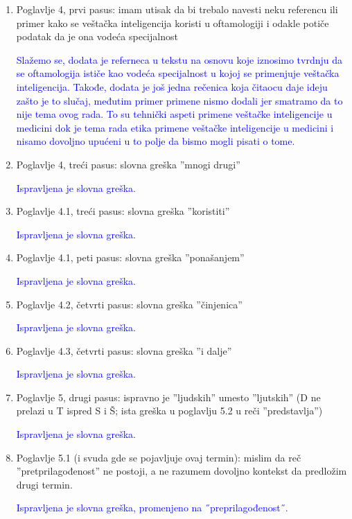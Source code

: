 \documentclass[a4paper]{report}
\newcommand{\odgovor}[1]{\textcolor{blue}{#1}}
\begin{document}
\begin{enumerate}
\item Poglavlje 4, prvi pasus: imam utisak da bi trebalo navesti neku referencu ili primer kako se veštačka inteligencija koristi u oftamologiji i odakle potiče podatak da je ona vodeća specijalnost 

\odgovor{Slažemo se, dodata je referneca u tekstu na osnovu koje iznosimo tvrdnju da se oftamologija ističe kao vodeća specijalnost u kojoj se primenjuje veštačka inteligencija. Takođe, dodata je još jedna rečenica koja čitaocu daje ideju zašto je to slučaj, međutim primer primene nismo dodali jer smatramo da to nije tema ovog rada. To su tehnički aspeti primene veštačke inteligencije u medicini dok je tema rada etika primene veštačke inteligencije u medicini i nisamo dovoljno upućeni u to polje da bismo mogli pisati o tome.} 

\item Poglavlje 4, treći pasus: slovna greška ''mnogi drugi''

\odgovor{Ispravljena je slovna greška.}

\item Poglavlje 4.1, treći pasus: slovna greška ''koristiti''

\odgovor{Ispravljena je slovna greška.}

\item Poglavlje 4.1, peti pasus: slovna greška ''ponašanjem''

\odgovor{Ispravljena je slovna greška.}

\item Poglavlje 4.2, četvrti pasus: slovna greška ''činjenica''

\odgovor{Ispravljena je slovna greška.}

\item Poglavlje 4.3, četvrti pasus: slovna greška ''i dalje''

\odgovor{Ispravljena je slovna greška.}

\item Poglavlje 5, drugi pasus: ispravno je ''ljudskih'' umesto ''ljutskih'' (D ne prelazi u T ispred S i Š; ista greška u poglavlju 5.2 u reči ''predstavlja'')

\odgovor{Ispravljena je slovna greška.}

\item Poglavlje 5.1 (i svuda gde se pojavljuje ovaj termin): mislim da reč ''pretprilagođenost'' ne postoji, a ne razumem dovoljno kontekst da predložim drugi termin.

\odgovor{Ispravljena je slovna greška, promenjeno na ˝preprilagođenost˝.}


\end{enumerate}
\end{document}
